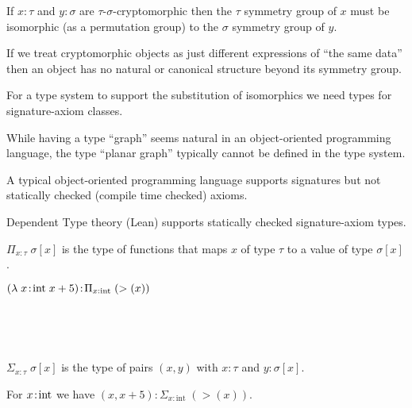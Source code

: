 {\vfill
If $x\!:\!\tau$ and $y\!:\!\sigma$ are $\tau$-$\sigma$-cryptomorphic then the $\tau$ symmetry group of $x$ must be isomorphic (as a permutation group) to the $\sigma$ symmetry group of $y$.

\vfill
If we treat cryptomorphic objects as just different expressions of ``the same data'' then an object has no natural or canonical structure beyond its symmetry group.


For a type system to support the substitution of isomorphics we need types for signature-axiom classes.

\vfill
While having a type ``graph'' seems natural in an object-oriented programming language, the type ``planar graph'' typically cannot be defined in the type system.

\vfill
A typical object-oriented programming language supports signatures but not statically checked (compile time checked) axioms.

\vfill
Dependent Type theory (Lean) supports statically checked signature-axiom types.


$\Pi_{x:\tau}\;\sigma[x]$ is the type of functions that maps $x$ of type $\tau$ to a value of type $\sigma[x]$.

\vfill
$(\lambda\; x\!:\!\mathrm{int}\;x+5)\!:\!\Pi_{x:\mathrm{int}}\;(>(x))$


~ \hfill\unnamed
    {
    }{
      }
\hfill ~

~ \hfill\unnamed
    {
    }{
      }
\hfill ~


$\Sigma_{x:\tau}\;\sigma[x]$ is the type of pairs $(x,y)$ with $x:\tau$ and $y:\sigma[x]$.

\vfill
For $x\!:\!\mathrm{int}$ we have $(x,x+5)\!:\!\Sigma_{x:\mathrm{int}}\;(>(x))$.


~ \hfill\unnamed
    {
    }{
      }
\hfill ~

}
